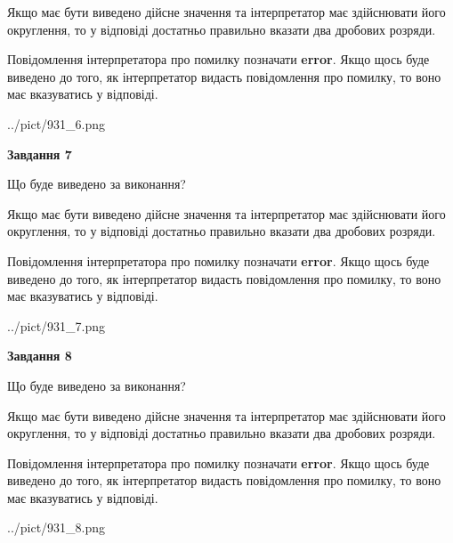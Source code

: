 \documentclass[12pt, ukrainian]{article}
\begin{document}
{\begin {Large}
Якщо має бути виведено дійсне значення та інтерпретатор має здійснювати його округлення, 
то у відповіді достатньо правильно вказати два дробових розряди.

Повідомлення інтерпретатора про помилку позначати \textbf{error}.
Якщо щось буде виведено до того, як інтерпретатор видасть повідомлення про помилку, 
то воно має вказуватись у відповіді. \par

\begin{center}
	{../pict/931_6.png}
\end{center}
\newpage

{\begin {center}\textbf{Завдання 7}\end {center}}\par
Що буде виведено за виконання? \par

Якщо має бути виведено дійсне значення та інтерпретатор має здійснювати його округлення, 
то у відповіді достатньо правильно вказати два дробових розряди.

Повідомлення інтерпретатора про помилку позначати \textbf{error}.
Якщо щось буде виведено до того, як інтерпретатор видасть повідомлення про помилку, 
то воно має вказуватись у відповіді. \par

\begin{center}
	{../pict/931_7.png}
\end{center}
\newpage

{\begin {center}\textbf{Завдання 8}\end {center}}\par
Що буде виведено за виконання? \par

Якщо має бути виведено дійсне значення та інтерпретатор має здійснювати його округлення, 
то у відповіді достатньо правильно вказати два дробових розряди.

Повідомлення інтерпретатора про помилку позначати \textbf{error}.
Якщо щось буде виведено до того, як інтерпретатор видасть повідомлення про помилку, 
то воно має вказуватись у відповіді. \par

\begin{center}
	{../pict/931_8.png}
\end{center}
\newpage


\end{Large}}
\end{document}
